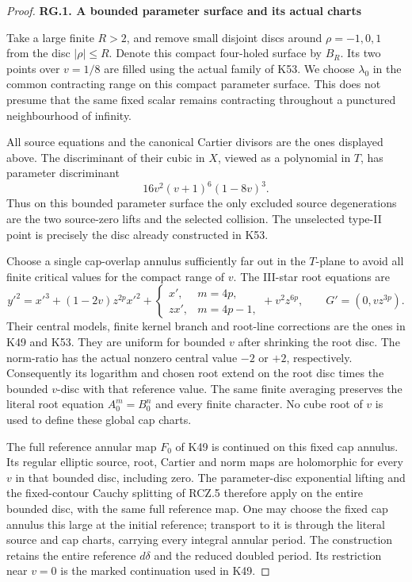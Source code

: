 \begin{proof}
\par

\medskip\noindent\textbf{RG.1. A bounded parameter surface and its actual charts}

\par\nobreak

Take a large finite \(R>2\), and remove small disjoint discs around
\(\rho=-1,0,1\) from the disc \(|\rho|\le R\). Denote this compact
four-holed surface by \(B_R\). Its two points over \(v=1/8\) are
filled using the actual family of K53. We choose \(\lambda_0\) in
the common contracting range on this compact parameter surface.
This does not presume that the same fixed scalar remains
contracting throughout a punctured neighbourhood of infinity.

All source equations and the canonical Cartier divisors are the
ones displayed above. The discriminant of their cubic in \(X\),
viewed as a polynomial in \(T\), has parameter discriminant
\[
 16v^2(v+1)^6(1-8v)^3.
\]
Thus on this bounded parameter surface the only excluded source
degenerations are the two source-zero lifts and the selected
collision. The unselected type-II point is precisely the disc
already constructed in K53.

Choose a single cap-overlap annulus sufficiently far out in the
\(T\)-plane to avoid all finite critical values for the compact
range of \(v\). The III-star root equations are
\[
 y'^2=x'^3+(1-2v)z^{2p}x'^2+
 \begin{cases}x',&m=4p,\\zx',&m=4p-1,\end{cases}
 +v^2z^{6p},\qquad G'=(0,vz^{3p}).
\]
Their central models, finite kernel branch and root-line
corrections are the ones in K49 and K53. They are uniform for
bounded \(v\) after shrinking the root disc. The norm-ratio has
the actual nonzero central value \(-2\) or \(+2\), respectively.
Consequently its logarithm and chosen root extend on the root
disc times the bounded \(v\)-disc with that reference value.
The same finite averaging preserves the literal root equation
\(A_0^m=B_0^n\) and every finite character. No cube root of \(v\)
is used to define these global cap charts.

The full reference annular map \(F_0\) of K49 is continued on
this fixed cap annulus. Its regular elliptic source, root,
Cartier and norm maps are holomorphic for every \(v\) in that
bounded disc, including zero. The parameter-disc exponential
lifting and the fixed-contour Cauchy splitting of RCZ.5 therefore
apply on the entire bounded disc, with the same full reference
map. One may choose the fixed cap annulus this large at the
initial reference; transport to it is through the literal source
and cap charts, carrying every integral annular period. The
construction retains the entire reference \(d\delta\) and the
reduced doubled period. Its restriction near \(v=0\) is the
marked continuation used in K49.


\end{proof}
